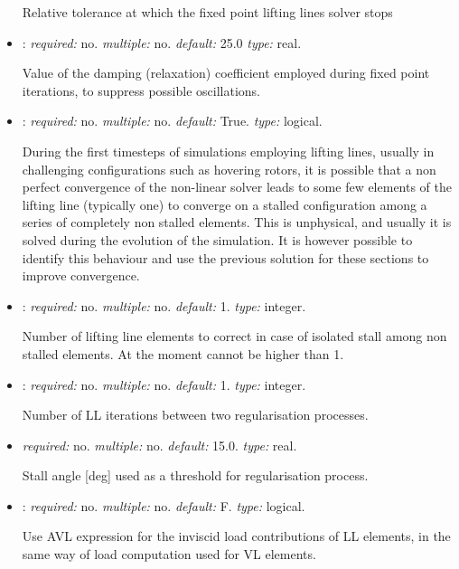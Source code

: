 \begin{itemize}
Relative tolerance at which the fixed point lifting lines solver stops

\item {}: \textit{required:} no. \textit{multiple:} no. 
\textit{default:} 25.0 \textit{type:} real.

Value of the damping (relaxation) coefficient employed during fixed point 
iterations, to suppress possible oscillations.

\item {}: \textit{required:} no. 
\textit{multiple:} no. \textit{default:} True. \textit{type:} logical.

During the first timesteps of simulations employing lifting lines, 
usually in challenging configurations such as hovering rotors, 
it is possible that a non perfect convergence of the non-linear 
solver leads to some few elements of the lifting line (typically one) 
to converge on a stalled configuration among a series of completely 
non stalled elements. This is unphysical, and usually it is solved 
during the evolution of the simulation. It is however possible to 
identify this behaviour and use the previous solution for these 
sections to improve convergence. 

\item {}: \textit{required:} no. 
\textit{multiple:} no. \textit{default:} 1. \textit{type:} integer.

Number of lifting line elements to correct in case of isolated 
stall among non stalled elements. At the moment cannot be higher than 1.

\item {}: \textit{required:} no. 
\textit{multiple:} no. \textit{default:} 1. \textit{type:} integer.

Number of LL iterations between two regularisation processes.

\item {} \textit{required:} no. 
\textit{multiple:} no. \textit{default:} 15.0. \textit{type:} real.

Stall angle [deg] used as a threshold for regularisation process. 

\item {}: \textit{required:} no. \textit{multiple:} no. 
\textit{default:} F. \textit{type:} logical.

Use AVL expression for the inviscid load contributions of LL elements, 
in the same way of load computation used for VL elements. 


\end{itemize}
